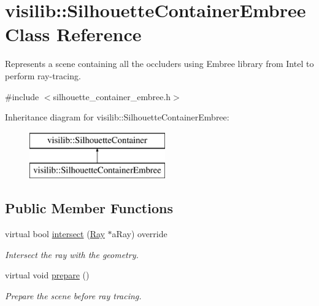 \hypertarget{classvisilib_1_1_silhouette_container_embree}{}\section{visilib\+::Silhouette\+Container\+Embree Class Reference}
\label{classvisilib_1_1_silhouette_container_embree}


Represents a scene containing all the occluders using Embree library from Intel to perform ray-\/tracing.  




{\ttfamily \#include $<$silhouette\+\_\+container\+\_\+embree.\+h$>$}

Inheritance diagram for visilib\+::Silhouette\+Container\+Embree\+:\begin{figure}[H]
\begin{center}
\leavevmode
\includegraphics[height=2.000000cm]{classvisilib_1_1_silhouette_container_embree}
\end{center}
\end{figure}
\subsection*{Public Member Functions}
\begin{DoxyCompactItemize}
\item 
virtual bool \mbox{\hyperlink{classvisilib_1_1_silhouette_container_embree_a3a7290096b31163d775b11a356b7d3e0}{intersect}} (\mbox{\hyperlink{structvisilib_1_1_ray}{Ray}} $\ast$a\+Ray) override
\begin{DoxyCompactList}\small\item\em Intersect the ray with the geometry. \end{DoxyCompactList}\item 
virtual void \mbox{\hyperlink{classvisilib_1_1_silhouette_container_embree_ad3d6193f5484b3fb56096efd8a1230a8}{prepare}} ()
\begin{DoxyCompactList}\small\item\em Prepare the scene before ray tracing. \end{DoxyCompactList}\end{DoxyCompactItemize}
